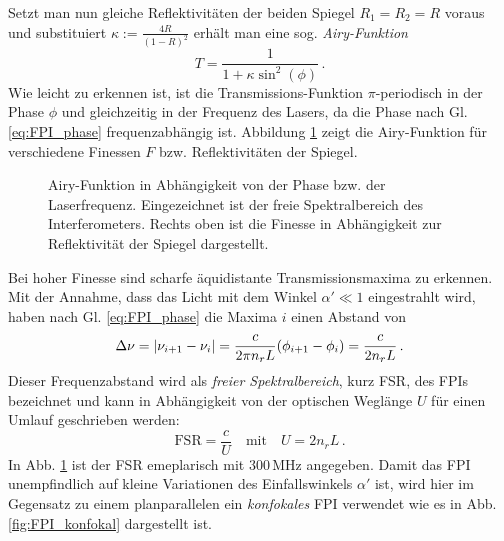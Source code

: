 Setzt man nun gleiche Reflektivitäten der beiden Spiegel $R_1=R_2=R$ voraus und
substituiert $\kappa:=\frac{4R}{(1-R)^2}$ erhält man eine sog.
\textit{Airy-Funktion}
\begin{equation}\label{eq:FPI_airy-funktion}
	T=\frac{1}{1+\kappa\sin^2{(\phi)}}\,.
\end{equation}
Wie leicht zu erkennen ist, ist die Transmissions-Funktion $\pi$-periodisch in
der Phase $\phi$ und gleichzeitig in der Frequenz des Lasers, da die Phase nach
Gl. \eqref{eq:FPI_phase} frequenzabhängig ist. Abbildung
\ref{fig:airy-funktion} zeigt die Airy-Funktion für verschiedene Finessen
$F$ bzw. Reflektivitäten der Spiegel.
\begin{figure}[h]
	\centering
	\footnotesize
	
	\caption[Airy-Funktion]{Airy-Funktion
	in Abhängigkeit von der Phase bzw.
	der Laserfrequenz. Eingezeichnet ist
	der freie Spektralbereich des
	Interferometers. Rechts oben ist die
	Finesse in Abhängigkeit zur
	Reflektivität der Spiegel dargestellt.}\label{fig:airy-funktion}
\end{figure}
Bei hoher Finesse sind scharfe
äquidistante Transmissionsmaxima zu erkennen. Mit der Annahme, dass das Licht
mit dem Winkel $\alpha'\ll1$ eingestrahlt wird, haben nach Gl.
\eqref{eq:FPI_phase} die Maxima $i$ einen Abstand von
\begin{equation}\label{eq:FPI_transmissionsmaxima}
	\Delta\nu=\left|\nu_{i+1}-\nu_i\right|=\frac{c}{2\pi	n_rL}(\phi_{i+1}-\phi_i)=\frac{c}{2n_rL}\,.
\end{equation}
Dieser Frequenzabstand wird als \textit{freier Spektralbereich}, kurz FSR, des
FPIs bezeichnet und kann in Abhängigkeit von der optischen Weglänge $U$ für
einen Umlauf geschrieben werden:
\begin{equation}\label{eq:FPI_FSR_01}
	\text{FSR}=\frac{c}{U}
	\quad\text{mit}\quad
	U=2n_rL\,.
\end{equation}
In Abb. \ref{fig:airy-funktion} ist der FSR emeplarisch mit $300\,$MHz
angegeben. Damit das FPI unempfindlich auf kleine Variationen des Einfallswinkels $\alpha'$
ist, wird hier im Gegensatz zu einem planparallelen ein \textit{konfokales} FPI
verwendet wie es in Abb. \ref{fig:FPI_konfokal} dargestellt ist.
